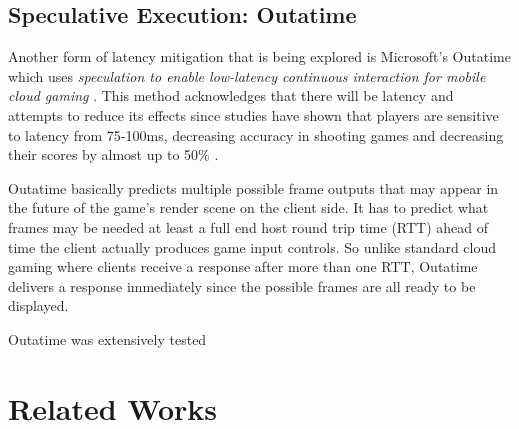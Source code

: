 \subsection{Speculative Execution: Outatime}
Another form of latency mitigation that is being explored is Microsoft's Outatime which uses \textit{speculation to enable low-latency continuous interaction for mobile cloud gaming} \cite{lee2015outatime}. This method acknowledges that there will be latency and attempts to reduce its effects since studies have shown that players are sensitive to latency from 75-100ms, decreasing accuracy in shooting games and decreasing their scores by almost up to 50\% \cite{beigbeder2004effects}.
\newline 
\par
Outatime basically predicts multiple possible frame outputs that may appear in the future of the game's render scene on the client side. It has to predict what frames may be needed at least a full end host round trip time (RTT) ahead of time the client actually produces game input controls. So unlike standard cloud gaming where clients receive a response after more than one RTT, Outatime delivers a response immediately since the possible frames are all ready to be displayed.
\newline
\par
Outatime was extensively tested

\section{Related Works}
\lipsum[1-1] 